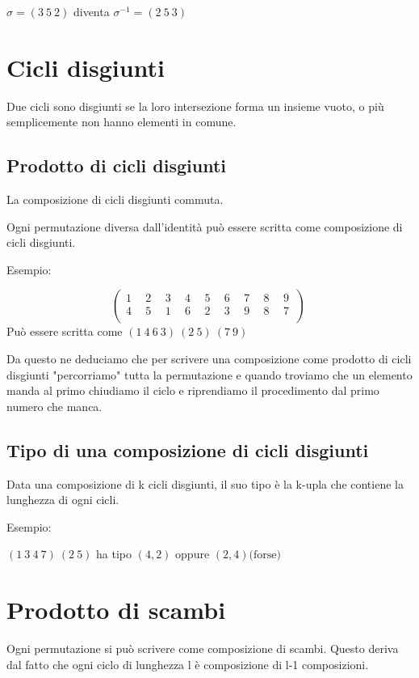 \documentclass[a4paper, 10pt]{article}
\begin{document}
$\sigma=\left(3\ 5\ 2\right)$ diventa $\sigma^{-1}=\left(2\ 5\ 3\right)$

\section{Cicli disgiunti}

Due cicli sono disgiunti se la loro intersezione forma un insieme vuoto, o più semplicemente non hanno elementi in comune.

\subsection{Prodotto di cicli disgiunti}

La composizione di cicli disgiunti commuta.

Ogni permutazione diversa dall'identità può essere scritta come composizione di cicli disgiunti.

Esempio:

$$\left(\begin{matrix}1\ &\ 2\ &\ 3\ &\ 4\ &\ 5\ &\ 6\ &\ 7\ &\ 8\ &\ 9\ \\4\ &\ 5\ &\ 1\ &\ 6\ &\ 2\ &\ 3\ &\ 9\ &\ 8\ &\ 7\ \\\end{matrix}\right)\ 
$$ 
Può essere scritta come $\left(1\ 4\ 6\ 3\right)\ \left(2\ 5\right)\ \left(7\ 9\right)$

Da questo ne deduciamo che per scrivere una composizione come prodotto di cicli disgiunti "percorriamo" tutta la permutazione e quando troviamo che un elemento manda al primo chiudiamo il ciclo e riprendiamo il procedimento dal primo numero che manca.

\subsection{Tipo di una composizione di cicli disgiunti}

Data una composizione di k cicli disgiunti, il suo tipo è la k-upla che contiene la lunghezza di ogni cicli.

Esempio:

$\left(1\ 3\ 4\ 7\right)\ \left(2\ 5\right)$ ha tipo $(4, 2)$ oppure $(2, 4)\text{(forse)}$

\section{Prodotto di scambi}

Ogni permutazione si può scrivere come composizione di scambi. Questo deriva dal fatto che ogni ciclo di lunghezza l è composizione di l-1 composizioni.
\end{document}
